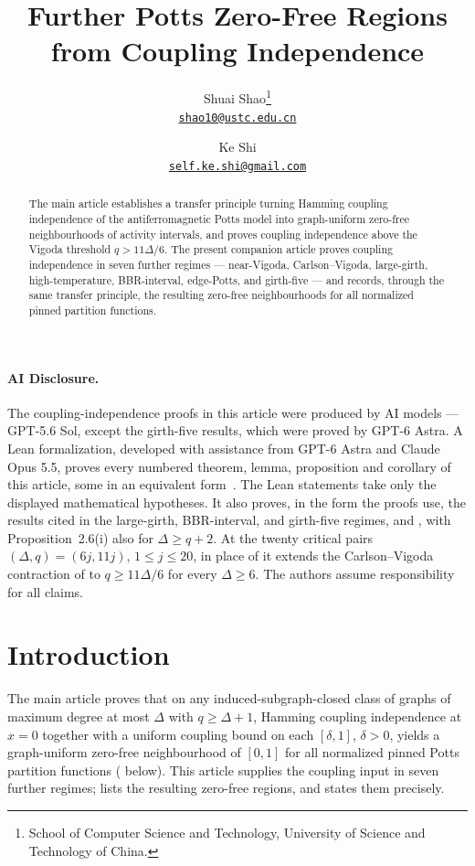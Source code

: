 \documentclass[11pt,reqno]{article}
\title{\bfseries Further Potts Zero-Free Regions from Coupling Independence}
\author{Shuai Shao\thanks{School of Computer Science and Technology,
    University of Science and Technology of China.}\\
  \href{mailto:shao10@ustc.edu.cn}{\texttt{shao10@ustc.edu.cn}}
\and
Ke Shi\footnotemark[1]\\
\href{mailto:self.ke.shi@gmail.com}{\texttt{self.ke.shi@gmail.com}}}
\date{}
\theoremstyle{plain}
\theoremstyle{definition}
\theoremstyle{remark}
\newcommand{\Deg}{\Delta}                        %
\begin{document}
\maketitle

\begin{abstract}
The main article \cite{ShaoShi2026CI2ZF} establishes a transfer principle
turning Hamming coupling independence of the antiferromagnetic Potts model
into graph-uniform zero-free neighbourhoods of activity intervals, and
proves coupling independence above the Vigoda threshold
\(q>11\Deg/6\).  The present companion article proves coupling
independence in seven further regimes --- near-Vigoda, Carlson--Vigoda,
large-girth, high-temperature, BBR-interval, edge-Potts, and girth-five
--- and records, through the same transfer principle, the resulting
zero-free neighbourhoods for all normalized pinned partition functions.
\end{abstract}

\paragraph*{AI Disclosure.}
The coupling-independence proofs in this article were produced by AI
models --- GPT-5.6 Sol, except the girth-five results, which were proved
by GPT-6 Astra.  A Lean formalization, developed with assistance from
GPT-6 Astra and Claude Opus 5.5, proves every numbered
theorem, lemma, proposition and corollary of this article, some in an
equivalent form~\cite{Shi2026Formalization}.
The Lean statements take only the displayed mathematical hypotheses.
It also proves, in the form the proofs use, the results cited in the
large-girth, BBR-interval, and girth-five regimes,
\cite[Lemmas~5.13 and~8.7 and Equation~(10)]{CLMM2023} and
\cite[Proposition~2.6(i) and Theorem~2.5]{BencsBerrekkalRegts2025Trees},
with Proposition~2.6(i) also for \(\Deg\ge q+2\).
At the twenty critical pairs \((\Deg,q)=(6j,11j)\), \(1\le j\le20\), in
place of \cite[Theorem~20]{CFFGZZ2024} it extends the Carlson--Vigoda
contraction of  to \(q\ge11\Deg/6\) for every
\(\Deg\ge6\).  The authors assume responsibility for all claims.

\setcounter{tocdepth}{2}
\tableofcontents

\section{Introduction}
\label{sec:companion-intro}

The main article \cite{ShaoShi2026CI2ZF} proves that on any
induced-subgraph-closed class of graphs of maximum degree at most
\(\Deg\) with \(q\ge\Deg+1\), Hamming coupling independence at \(x=0\)
together with a uniform coupling bound on each \([\delta,1]\),
\(\delta>0\), yields a graph-uniform zero-free neighbourhood of
\([0,1]\) for all normalized pinned Potts partition functions
( below).  This article supplies the coupling
input in seven further regimes;  lists the
resulting zero-free regions, and
 states them precisely.
\end{document}
